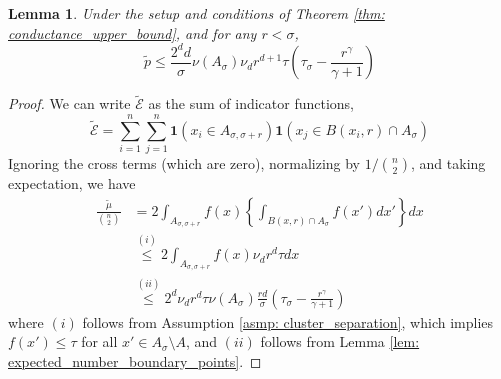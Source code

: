 \documentclass{article}
\newcommand{\Asig}{A_{\sigma}}
\newcommand{\Asigr}{A_{\sigma,\sigma + r}}
\newcommand{\1}{\mathbf{1}}
\theoremstyle{aldenthm}
\newtheorem{lemma}{Lemma}
\begin{document}
\begin{lemma}
	\label{lem: expected_density_cut}
	Under the setup and conditions of Theorem \ref{thm: conductance_upper_bound}, and for any $r < \sigma$,
	\begin{equation*}
	\widetilde{p} \leq \frac{2^d d}{\sigma} \nu(\Asig) \nu_d r^{d+1} \tau \left(\tau_{\sigma} - \frac{r^{\gamma}}{\gamma + 1}\right)
	\end{equation*}
\end{lemma}
\begin{proof}
	We can write $\widetilde{\mathcal{E}}$ as the sum of indicator functions,
	\begin{equation}
	\label{eqn: density_cut_expansion}
	\widetilde{\mathcal{E}} = \sum_{i = 1}^{n} \sum_{j = 1}^{n} \1(x_i \in \Asigr) \1(x_j \in B(x_i,r) \cap \Asig)
	\end{equation}
	Ignoring the cross terms (which are zero), normalizing by $1/{n \choose 2}$, and taking expectation, we have
	\begin{align*}
	\frac{\widetilde{\mu}}{{n \choose 2}} & = 2 \int_{\Asigr} f(x) \left\{ \int_{B(x,r) \cap \Asig} f(x') dx'\right\} dx \\
	& \overset{(i)}{\leq} 2 \int_{\Asigr} f(x) \nu_d r^d \tau dx \\
	& \overset{(ii)}{\leq} 2^d \nu_d r^d \tau \nu(A_\sigma) \frac{rd}{\sigma} \left(\tau_{\sigma} - \frac{r^{\gamma}}{\gamma + 1}\right) 
	\end{align*}
	where $(i)$ follows from Assumption \ref{asmp: cluster_separation}, which implies $f(x') \leq \tau$ for all $x' \in \Asig \setminus A$, and $(ii)$ follows from Lemma \ref{lem: expected_number_boundary_points}.
\end{proof}
\end{document}
